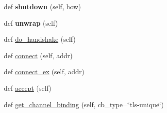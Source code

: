 \begin{DoxyCompactItemize}
\mbox{\label{classgevent_1_1__ssl3_1_1_s_s_l_socket_ac4964a8a0c2607ea3a3090d4edbe46aa}} 
def {\bfseries shutdown} (self, how)
\item 
\mbox{\label{classgevent_1_1__ssl3_1_1_s_s_l_socket_ac790ec7967f7253d90b30602cd6a0e46}} 
def {\bfseries unwrap} (self)
\item 
def \hyperlink{classgevent_1_1__ssl3_1_1_s_s_l_socket_ab006b95491b0f2ff9e768950388f47c4}{do\+\_\+handshake} (self)
\item 
def \hyperlink{classgevent_1_1__ssl3_1_1_s_s_l_socket_a0e2d0c00a0cf5b917f3a2535c1d50ef4}{connect} (self, addr)
\item 
def \hyperlink{classgevent_1_1__ssl3_1_1_s_s_l_socket_a9519423cdfc8b54fd45275087c9194ef}{connect\+\_\+ex} (self, addr)
\item 
def \hyperlink{classgevent_1_1__ssl3_1_1_s_s_l_socket_ab0af1f088dae8fb8e2e1d94ebea1795d}{accept} (self)
\item 
def \hyperlink{classgevent_1_1__ssl3_1_1_s_s_l_socket_a0f023363a0c398f177dc2b45cb26d3f8}{get\+\_\+channel\+\_\+binding} (self, cb\+\_\+type=\char`\"{}tls-\/unique\char`\"{})
\end{DoxyCompactItemize}
